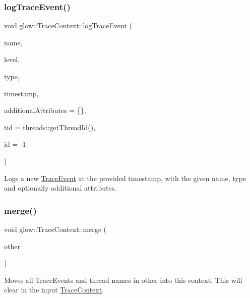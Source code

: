 \subsubsection{\texorpdfstring{log\+Trace\+Event()}{logTraceEvent()}\hspace{0.1cm}{\footnotesize\ttfamily [2/2]}}
{\footnotesize\ttfamily void glow\+::\+Trace\+Context\+::log\+Trace\+Event (\begin{DoxyParamCaption}\item[{llvm\+::\+String\+Ref}]{name,  }\item[{\hyperlink{structglow_1_1_trace_event_a10132a384d74408a112510cbe1b7d978}{Trace\+Level}}]{level,  }\item[{char}]{type,  }\item[{uint64\+\_\+t}]{timestamp,  }\item[{std\+::map$<$ std\+::string, std\+::string $>$}]{additional\+Attributes = {\ttfamily \{\}},  }\item[{size\+\_\+t}]{tid = {\ttfamily threads\+:\+:getThreadId()},  }\item[{int}]{id = {\ttfamily -\/1} }\end{DoxyParamCaption})}

Logs a new \hyperlink{structglow_1_1_trace_event}{Trace\+Event} at the provided {\ttfamily timestamp}, with the given {\ttfamily name}, {\ttfamily type} and optionally additional attributes. \mbox{\label{classglow_1_1_trace_context_a8692d50a5df71cd51a2906a0943de4c8}} 
\subsubsection{\texorpdfstring{merge()}{merge()}\hspace{0.1cm}{\footnotesize\ttfamily [1/2]}}
{\footnotesize\ttfamily void glow\+::\+Trace\+Context\+::merge (\begin{DoxyParamCaption}\item[{\hyperlink{classglow_1_1_trace_context}{Trace\+Context} $\ast$}]{other }\end{DoxyParamCaption})}

Moves all Trace\+Events and thread names in {\ttfamily other} into this context. This will clear in the input \hyperlink{classglow_1_1_trace_context}{Trace\+Context}. \mbox{\label{classglow_1_1_trace_context_a440b03f909dacec97974f02ba41ec2f7}} 
